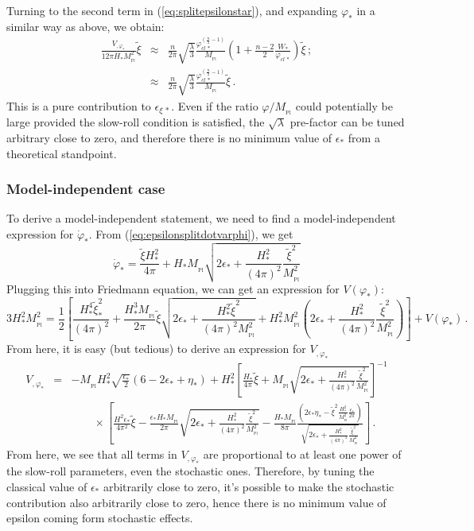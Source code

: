 \documentclass[prd, onecolumn, floatfix, letterpaper, nofootinbib, amsmath, amssymb, superscriptaddress]{revtex4}
\renewcommand{\(}{\left(}
\renewcommand{\)}{\right)}
\renewcommand{\[}{\left[}
\renewcommand{\]}{\right]}
\def\be{\begin{equation}}
\def\ee{\end{equation}}
\def\bea{\begin{eqnarray}}
\def\eea{\end{eqnarray}}
\newcommand{\Mp}{M_{_\mathrm{Pl}}}
\begin{document}
Turning to the second term in (\ref{eq:splitepsilonstar}), and expanding $\varphi_*$ in a similar way as above, we obtain:
\bea
	\frac{V_{,\varphi_*}}{12\pi H_*\Mp^2}\tilde{\xi}&\approx&  \frac{n}{2\pi}\sqrt{\frac{\lambda}{3}}\frac{\varphi_{cl\,*}^{(\frac{n}{2}-1)}}{\Mp}\left(1+\frac{n-2}{2}\frac{W_*}{\varphi_{cl\,*}} \right)\tilde\xi \, ;\\
	&\approx&\frac{n}{2\pi}\sqrt{\frac{\lambda}{3}}\frac{\varphi_{cl\,*}^{(\frac{n}{2}-1)}}{\Mp}\tilde\xi \, .
\eea
This is a pure contribution to $\epsilon_{\xi\, *}$. Even if the ratio $\varphi/\Mp$ could potentially be large provided the slow-roll condition is satisfied, the $\sqrt{\lambda}$ pre-factor can be tuned arbitrary close to zero, and therefore there is no minimum value of $\epsilon_*$ from a theoretical standpoint.

\subsubsection{Model-independent case}
To derive a model-independent statement, we need to find a model-independent expression for $\dot\varphi_*$. 
From (\ref{eq:epsilonsplitdotvarphi}), we get
\be
	\dot\varphi_*=\frac{\tilde\xi H_*^2}{4\pi}+H_*\Mp\sqrt{2\epsilon_*+\frac{H^2_*}{(4\pi)^2}\frac{\tilde\xi^2}{\Mp^2}}
\ee
Plugging this into Friedmann equation, we can get an expression for $V(\varphi_*)$:
\be
	3H^2_*\Mp^2=\frac{1}{2}\left[\frac{H_*^4\tilde\xi_*^2}{(4\pi)^2} +\frac{H^3_*\Mp}{2\pi}\tilde\xi\sqrt{2\epsilon_* +\frac{H^2_*\tilde\xi^2}{(4\pi)^2\Mp^2}} +H_*^2\Mp^2\left(2\epsilon_*+\frac{H^2_*}{(4\pi)^2}\frac{\tilde\xi^2}{\Mp^2}\right)\right]+V(\varphi_*)\, .
\ee
From here, it is easy (but tedious) to derive an expression for $V_{,\varphi_*}$
\bea
	V_{,\varphi_*}&=& -\Mp H^2_*\sqrt{\frac{\epsilon_*}{2}}(6-2\epsilon_*+\eta_*)+H^2_*\left[ \frac{H_*}{4\pi}\tilde\xi +\Mp\sqrt{2\epsilon_*+\frac{H^2_*}{(4\pi)^2}\frac{\tilde\xi^2}{\Mp^2}}\right]^{-1}\nonumber\\
	&&\qquad\times\left[ \frac{H^2\epsilon_*}{4\pi^2}\tilde\xi - \frac{\epsilon_*H_*\Mp}{2\pi}\sqrt{2\epsilon_*+\frac{H^2_*}{(4\pi)^2}\frac{\tilde\xi^2}{\Mp^2}}-\frac{H_*\Mp}{8\pi}\frac{(2\epsilon_*\eta_*-\tilde\xi^2\frac{H^2_*}{\Mp^2}\frac{\epsilon_*}{2\pi})}{\sqrt{2\epsilon_*+\frac{H^2_*}{(4\pi)^2}\frac{\tilde\xi^2}{\Mp^2}}} \right]\, .
\eea
From here, we see that all terms in $V_{,\varphi_*}$ are proportional to at least one power of the slow-roll parameters, even the stochastic ones. Therefore, by tuning the classical value of $\epsilon_*$ arbitrarily close to zero, it's possible to make the stochastic contribution also arbitrarily close to zero, hence there is no minimum value of epsilon coming form stochastic effects. 
\end{document}
